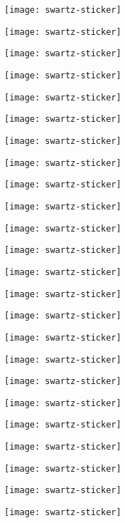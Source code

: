 \documentclass[a4paper,14pt]{extarticle}
\begin{document}

\parbox[c][34mm]{70mm}{\texttt{[image: swartz-sticker]} }
\parbox[c][34mm]{70mm}{\texttt{[image: swartz-sticker]} }
\parbox[c][34mm]{70mm}{\texttt{[image: swartz-sticker]} }

\vspace{2mm}


\parbox[c][34mm]{70mm}{\texttt{[image: swartz-sticker]} }
\parbox[c][34mm]{70mm}{\texttt{[image: swartz-sticker]} }
\parbox[c][34mm]{70mm}{\texttt{[image: swartz-sticker]} }

\vspace{2mm}



\parbox[c][34mm]{70mm}{\texttt{[image: swartz-sticker]} }
\parbox[c][34mm]{70mm}{\texttt{[image: swartz-sticker]} }
\parbox[c][34mm]{70mm}{\texttt{[image: swartz-sticker]} }


\vspace{4mm}


\parbox[c][34mm]{70mm}{\texttt{[image: swartz-sticker]} }
\parbox[c][34mm]{70mm}{\texttt{[image: swartz-sticker]} }
\parbox[c][34mm]{70mm}{\texttt{[image: swartz-sticker]} }

\vspace{2mm}


\parbox[c][34mm]{70mm}{\texttt{[image: swartz-sticker]} }
\parbox[c][34mm]{70mm}{\texttt{[image: swartz-sticker]} }
\parbox[c][34mm]{70mm}{\texttt{[image: swartz-sticker]} }

\vspace{4mm}


\parbox[c][34mm]{70mm}{\texttt{[image: swartz-sticker]} }
\parbox[c][34mm]{70mm}{\texttt{[image: swartz-sticker]} }
\parbox[c][34mm]{70mm}{\texttt{[image: swartz-sticker]} }

\vspace{2mm}


\parbox[c][34mm]{70mm}{\texttt{[image: swartz-sticker]} }
\parbox[c][34mm]{70mm}{\texttt{[image: swartz-sticker]} }
\parbox[c][34mm]{70mm}{\texttt{[image: swartz-sticker]} }




\parbox[c][34mm]{70mm}{\texttt{[image: swartz-sticker]} }
\parbox[c][34mm]{70mm}{\texttt{[image: swartz-sticker]} }
\parbox[c][34mm]{70mm}{\texttt{[image: swartz-sticker]} }
\end{document}
